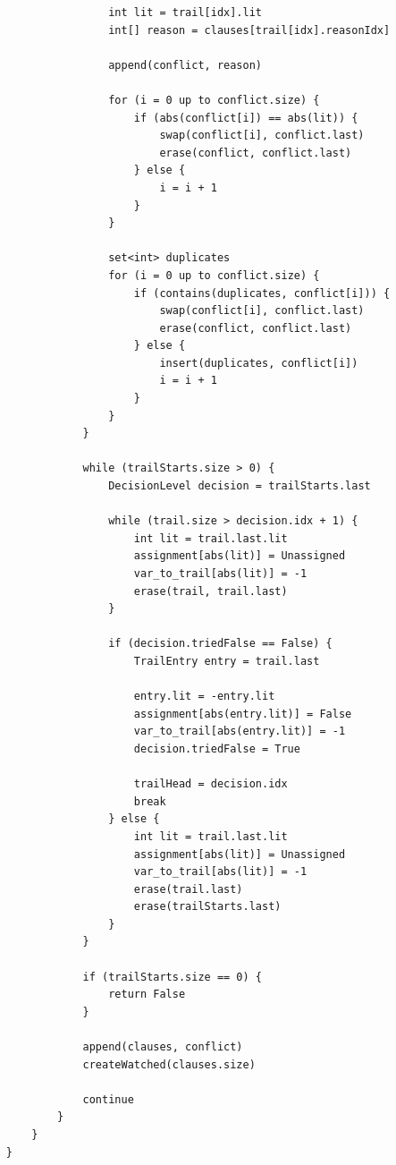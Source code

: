 \documentclass[../main.tex]{subfiles}
\begin{document}
\begin{lstlisting}
                    int lit = trail[idx].lit
                    int[] reason = clauses[trail[idx].reasonIdx]

                    append(conflict, reason)

                    for (i = 0 up to conflict.size) {
                        if (abs(conflict[i]) == abs(lit)) {
                            swap(conflict[i], conflict.last)
                            erase(conflict, conflict.last)
                        } else {
                            i = i + 1
                        }
                    }

                    set<int> duplicates
                    for (i = 0 up to conflict.size) {
                        if (contains(duplicates, conflict[i])) {
                            swap(conflict[i], conflict.last)
                            erase(conflict, conflict.last)
                        } else {
                            insert(duplicates, conflict[i])
                            i = i + 1
                        }
                    }
                }

                while (trailStarts.size > 0) {
                    DecisionLevel decision = trailStarts.last

                    while (trail.size > decision.idx + 1) {
                        int lit = trail.last.lit
                        assignment[abs(lit)] = Unassigned
                        var_to_trail[abs(lit)] = -1
                        erase(trail, trail.last)
                    }

                    if (decision.triedFalse == False) {
                        TrailEntry entry = trail.last

                        entry.lit = -entry.lit
                        assignment[abs(entry.lit)] = False
                        var_to_trail[abs(entry.lit)] = -1
                        decision.triedFalse = True

                        trailHead = decision.idx
                        break
                    } else {
                        int lit = trail.last.lit
                        assignment[abs(lit)] = Unassigned
                        var_to_trail[abs(lit)] = -1
                        erase(trail.last)
                        erase(trailStarts.last)
                    }
                }

                if (trailStarts.size == 0) {
                    return False
                }

                append(clauses, conflict)
                createWatched(clauses.size)

                continue
            }
        }
    }
\end{lstlisting}
\end{document}
